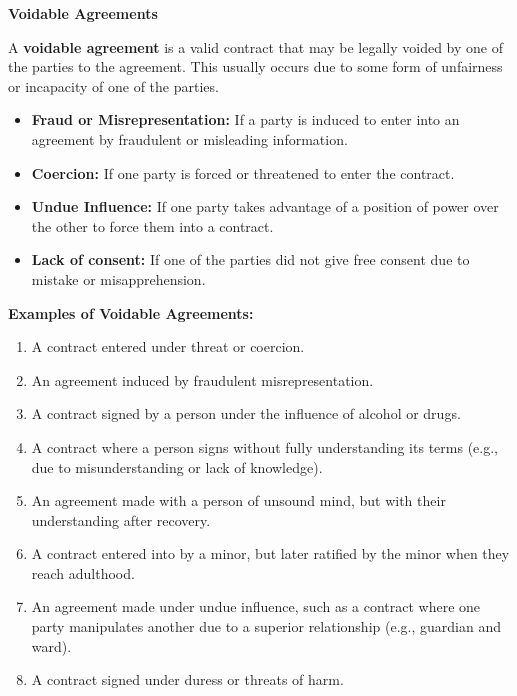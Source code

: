 \documentclass[12pt,a4paper]{book}
\begin{document}
\vspace{0.5cm}

\textbf{Voidable Agreements}  

A \textbf{voidable agreement} is a valid contract that may be legally voided by one of the parties to the agreement. This usually occurs due to some form of unfairness or incapacity of one of the parties.

\begin{itemize}
    \item \textbf{Fraud or Misrepresentation:} If a party is induced to enter into an agreement by fraudulent or misleading information.
    \item \textbf{Coercion:} If one party is forced or threatened to enter the contract.
    \item \textbf{Undue Influence:} If one party takes advantage of a position of power over the other to force them into a contract.
    \item \textbf{Lack of consent:} If one of the parties did not give free consent due to mistake or misapprehension.
\end{itemize}

\textbf{Examples of Voidable Agreements:}
\begin{enumerate}
    \item A contract entered under threat or coercion.
    \item An agreement induced by fraudulent misrepresentation.
    \item A contract signed by a person under the influence of alcohol or drugs.
    \item A contract where a person signs without fully understanding its terms (e.g., due to misunderstanding or lack of knowledge).
    \item An agreement made with a person of unsound mind, but with their understanding after recovery.
    \item A contract entered into by a minor, but later ratified by the minor when they reach adulthood.
    \item An agreement made under undue influence, such as a contract where one party manipulates another due to a superior relationship (e.g., guardian and ward).
    \item A contract signed under duress or threats of harm.
\end{enumerate}

\vspace{1cm}
\end{document}
